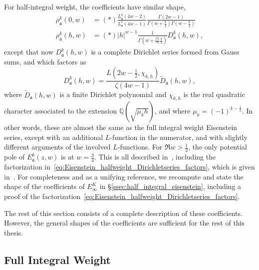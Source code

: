 For half-integral weight, the coefficients have similar shape,
\begin{equation}
  \begin{split}\label{eq:Eisenstein_halfweight_generalshape_coeffs}
    \rho_\mathfrak{a}^k(0, w) &= (*) \frac{L^k_\mathfrak{a}(4w-2)}{L^k_\mathfrak{a}(4w-1)}
    \frac{\Gamma(2w-1)}{\Gamma(w + \frac{k}{2}) \Gamma(w - \frac{k}{2})} \\
    \rho_\mathfrak{a}^k(h, w) &= (*) \lvert h \rvert^{w-1} \frac{1}{\Gamma(w +
    \frac{\lvert h \rvert}{h} \frac{k}{2})} D_\mathfrak{a}^k(h,w),
  \end{split}
\end{equation}
except that now $D_\mathfrak{a}^k(h,w)$ is a complete Dirichlet series formed from Gauss
sums, and which factors as
\begin{equation}\label{eq:Eisenstein_halfweight_Dirichletseries_factors}
  D_\mathfrak{a}^k(h,w) = \frac{L(2w - \frac{1}{2}, \chi_{k,h})}{\zeta(4w-1)}
  \widetilde{D}_\mathfrak{a}(h,w),
\end{equation}
where $\widetilde{D}_\mathfrak{a}(h,w)$ is a finite Dirichlet polynomial and $\chi_{k,h}$
is the real quadratic character associated to the extension $\mathbb{Q}(\sqrt{\mu_k h})$,
and where $\mu_k = (-1)^{k - \frac{1}{2}}$.
In other words, these are almost the same as the full integral weight Eisenstein series,
except with an additional $L$-function in the numerator, and with slightly different
arguments of the involved $L$-functions.
For $\Re w > \frac{1}{2}$, the only potential pole of $E_\mathfrak{a}^k(z,w)$ is at $w
= \frac{3}{4}$.
This is all described in~\cite{goldfeld1985eisenstein}, including the factorization
in~\eqref{eq:Eisenstein_halfweight_Dirichletseries_factors}, which is given
in~\cite[Corollary 1.3]{goldfeld1985eisenstein}.
For completeness and as a unifying reference, we recompute and state the shape of the
coefficients of $E_\infty^K$ in \S\ref{ssec:half_integral_eisenstein}, including a proof
of the factorization~\eqref{eq:Eisenstein_halfweight_Dirichletseries_factors}.


The rest of this section consists of a complete description of these coefficients.
However, the general shapes of the coefficients are sufficient for the rest of this
thesis.





\subsection{Full Integral Weight}\label{ssec:full_integral_eisenstein}


